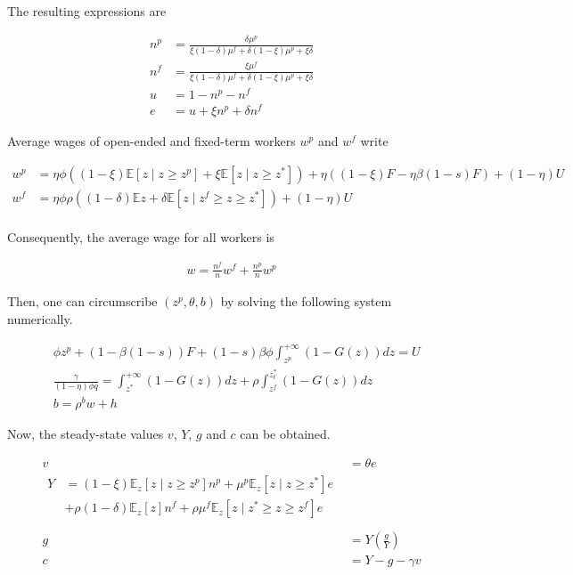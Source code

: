 The resulting expressions are

\begin{align*}
n^p &= \frac{\delta \mu^p}{\xi (1-\delta) \mu^f + \delta (1-\xi) \mu^p + \xi \delta}\\
n^f &= \frac{\xi \mu^f}{\xi (1-\delta) \mu^f + \delta (1-\xi) \mu^p + \xi \delta}\\
u &= 1-n^p-n^f\\
e &= u+\xi n^p + \delta n^f
\end{align*}

Average wages of open-ended and fixed-term workers $w^p$ and $w^f$ write

\begin{align*}
w^p &= \eta \phi \left( (1-\xi) \mathbb{E} \left[ z \mid z \geq z^p \right] + \xi \mathbb{E} \left[ z \mid z \geq z^* \right]\right) + \eta \left( (1-\xi) F - \eta \beta (1-s) F \right) + (1-\eta) U\\
w^f &= \eta \phi \rho \left( (1-\delta) \mathbb{E} z + \delta \mathbb{E} \left[ z \mid z^f \geq z \geq z^* \right] \right) + (1-\eta) U\\
\end{align*}

Consequently, the average wage for all workers is

\begin{align*}
w = \frac{n^f}{n} w^f + \frac{n^p}{n} w^p
\end{align*}

Then, one can circumscribe $\left( z^p , \theta, b \right)$ by solving the following system numerically.

\begin{align*}
&\phi z^p + \left( 1 - \beta (1-s) \right) F + (1-s)  \beta \phi \int_{z^p}^{+\infty} \left( 1 - G(z) \right) dz = U\\
&\frac{\gamma}{(1-\eta) \phi q} = \int_{ z^* }^{+\infty} \left( 1-G(z) \right) dz + \rho \int_{z^f}^{z_t^*} \left( 1-G(z) \right) dz\\
&b = \rho^b w + h
\end{align*}

Now, the steady-state values $v$, $Y$, $g$ and $c$ can be obtained.

\begin{align*}
v &= \theta e\\
\begin{split}
Y &= \left(1-\xi\right) \mathbb{E}_z \left[z \mid z \geq z^p \right] n^p + \mu^p \mathbb{E}_z \left[z \mid z \geq z^* \right] e\\
&+ \rho \left(1-\delta\right)  \mathbb{E}_z \left[ z \right]  n^f + \rho \mu^f \mathbb{E}_z \left[z \mid z^* \geq z \geq z^f \right] e\\
\end{split}\\
g &= Y \left( \frac{g}{Y} \right)\\
c &= Y-g-\gamma v
\end{align*}

